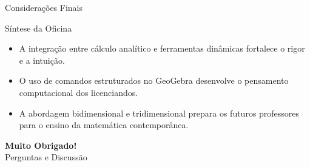 \documentclass[aspectratio=169, 13pt]{beamer}
\begin{document}
	\begin{frame}{Considerações Finais}
		\begin{block}{Síntese da Oficina}
			\begin{itemize}
				\item A integração entre cálculo analítico e ferramentas dinâmicas fortalece o rigor e a intuição.
				\item O uso de comandos estruturados no GeoGebra desenvolve o pensamento computacional dos licenciandos.
				\item A abordagem bidimensional e tridimensional prepara os futuros professores para o ensino da matemática contemporânea.
			\end{itemize}
		\end{block}
		
		\vspace{0.4cm}
		\centering
		\Large\textbf{\color{geogebrablue} Muito Obrigado!}\\
		\small Perguntas e Discussão
	\end{frame}
	
\end{document}
